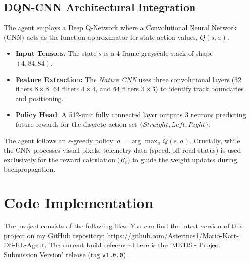 \documentclass[11pt,a4paper]{article}
\begin{document}
\subsection{DQN-CNN Architectural Integration}
The agent employs a Deep Q-Network where a Convolutional Neural Network (CNN) acts as the function approximator for state-action values, $Q(s, a)$.
\begin{itemize}
    \item \textbf{Input Tensors:} The state $s$ is a 4-frame grayscale stack of shape $(4, 84, 84)$.
    \item \textbf{Feature Extraction:} The \textit{Nature CNN} uses three convolutional layers (32 filters $8 \times 8$, 64 filters $4 \times 4$, and 64 filters $3 \times 3$) to identify track boundaries and positioning.
    \item \textbf{Policy Head:} A 512-unit fully connected layer outputs 3 neurons predicting future rewards for the discrete action set $\{Straight, Left, Right\}$.
\end{itemize}
The agent follows an $\epsilon$-greedy policy: $a = \arg\max_a Q(s, a)$. Crucially, while the CNN processes visual pixels, telemetry data (speed, off-road status) is used exclusively for the reward calculation ($R_t$) to guide the weight updates during backpropagation.

\section{Code Implementation}
The project consists of the following files. You can find the latest version of this project on my GitHub repository: \url{https://github.com/Asterinos1/Mario-Kart-DS-RL-Agent}. The current build referenced here is the 'MKDS - Project Submission Version' release (tag \texttt{v1.0.0})
\end{document}
